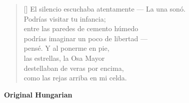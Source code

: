 \documentclass[a4paper,12pt,twoside,final]{book}
\begin{document}

\settowidth{\versewidth}{El silencio escuchaba atentamente --- La una sonó.}

\begin{verse}[\versewidth]
  El silencio escuchaba atentamente --- La una sonó. \\
  Podrías visitar tu infancia; \\
  entre las paredes de cemento húmedo \\
  podrías imaginar un poco de libertad --- \\
  pensé. Y al ponerme en pie, \\
  las estrellas, la Osa Mayor \\
  destellaban de veras por encima, \\
  como las rejas arriba en mi celda. \\
\end{verse}

\newpage


\noindent \textbf{Original Hungarian}



\settowidth{\versewidth}{gondoltam. S hát hát amint fölállok}
\end{document}
